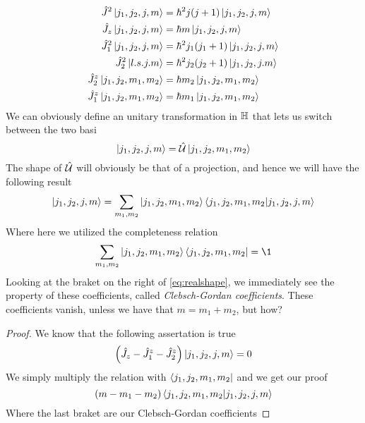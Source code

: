 \documentclass[../qm.tex]{subfiles}
\begin{document}
	\begin{equation}
		\begin{aligned}
			\hat{J}^2\ket{j_1,j_2,j,m}&=\hbar^2j(j+1)\ket{j_1,j_2,j,m}\\
			\hat{J}_z\ket{j_1,j_2,j,m}&=\hbar m\ket{j_1,j_2,j,m}\\
			\hat{J}_1^2\ket{j_1,j_2,j,m}&=\hbar^2j_1(j_1+1)\ket{j_1,j_2,j,m}\\
			\hat{J}_2^2\ket{l.s.j.m}&=\hbar^2j_2(j_2+1)\ket{j_1,j_2,j.m}\\
			\hat{J}_2^z\ket{j_1,j_2,m_1,m_2}&=\hbar m_2\ket{j_1,j_2,m_1,m_2}\\
			\hat{J}_1^z\ket{j_1,j_2,m_1,m_2}&=\hbar m_1\ket{j_1,j_2,m_1,m_2}
		\end{aligned}
		\label{eq:totalketaction}
	\end{equation}
	We can obviously define an unitary transformation in $\mathbb{H}$ that lets us switch between the two basi
	\begin{equation}
		\ket{j_1,j_2,j,m}=\hat{\mathcal{U}}\ket{j_1,j_2,m_1,m_2}
		\label{eq:unitarytransfclebsh}
	\end{equation}
	The shape of $\hat{\mathcal{U}}$ will obviously be that of a projection, and hence we will have the following result
	\begin{equation}
		\ket{j_1,j_2,j,m}=\sum_{m_1,m_2}\ket{j_1,j_2,m_1,m_2}\bra{j_1,j_2,m_1,m_2}\ket{j_1,j_2,j,m}
		\label{eq:realshape}
	\end{equation}
	Where here we utilized the completeness relation
	\begin{equation*}
		\sum_{m_1,m_2}\ket{j_1,j_2,m_1,m_2}\bra{j_1,j_2,m_1,m_2}=\1
	\end{equation*}
	Looking at the braket on the right of \eqref{eq:realshape}, we immediately see the property of these coefficients, called \textit{Clebsch-Gordan coefficients}. These coefficients vanish, unless we have that $m=m_1+m_2$, but how?
	\begin{proof}
	We know that the following assertation is true
	\begin{equation*}
		\left( \hat{J}_z-\hat{J}_1^z-\hat{J}_2^z \right)\ket{j_1,j_2,j,m}=0
	\end{equation*}
	We simply multiply the relation with $\bra{j_1,j_2,m_1,m_2}$ and we get our proof
	\begin{equation*}
		\left( m-m_1-m_2 \right)\bra{j_1,j_2,m_1,m_2}\ket{j_1,j_2,j,m}
	\end{equation*}
	Where the last braket are our Clebsch-Gordan coefficients
	\end{proof}
\end{document}
